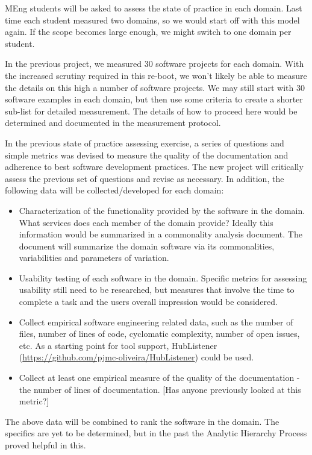 \documentclass[12pt]{article}
\begin{document}
MEng students will be asked to assess the state of practice in each domain.
Last time each student measured two domains, so we would start off with this
model again.  If the scope becomes large enough, we might switch to one domain
per student.

In the previous project, we measured 30 software projects for each domain.  With
the increased scrutiny required in this re-boot, we won't likely be able to
measure the details on this high a number of software projects.  We may still
start with 30 software examples in each domain, but then use some criteria to
create a shorter sub-list for detailed measurement.  The details of how to
proceed here would be determined and documented in the measurement protocol.

In the previous state of practice assessing exercise, a series of questions and
simple metrics was devised to measure the quality of the documentation and
adherence to best software development practices.  The new project will
critically assess the previous set of questions and revise as necessary.  In
addition, the following data will be collected/developed for each domain:

\begin{itemize}
\item Characterization of the functionality provided by the software in the
  domain.  What services does each member of the domain provide?  Ideally this
  information would be summarized in a commonality analysis document.  The
  document will summarize the domain software via its commonalities,
  variabilities and parameters of variation.
\item Usability testing of each software in the domain.  Specific metrics for
  assessing usability still need to be researched, but measures that involve the
  time to complete a task and the users overall impression would be considered.
\item Collect empirical software engineering related data, such as the number of
  files, number of lines of code, cyclomatic complexity, number of open issues,
  etc.  As a starting point for tool support, HubListener
  (\url{https://github.com/pjmc-oliveira/HubListener}) could be used.
\item Collect at least one empirical measure of the quality of the documentation
  - the number of lines of documentation.  [Has anyone previously looked at this
  metric?]
\end{itemize}

The above data will be combined to rank the software in the domain.  The
specifics are yet to be determined, but in the past the Analytic Hierarchy
Process proved helpful in this.
\end{document}
